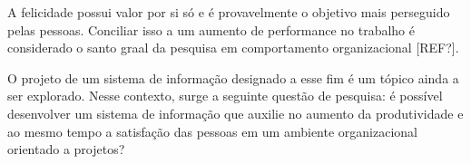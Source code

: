 A felicidade possui valor por si só e é provavelmente o objetivo mais perseguido pelas pessoas. Conciliar isso a um aumento de performance no trabalho é considerado o santo graal da pesquisa em comportamento organizacional [REF?]. 

O projeto de um sistema de informação designado a esse fim é um tópico ainda a ser explorado. Nesse contexto, surge a seguinte questão de pesquisa: é possível desenvolver um sistema de informação que auxilie no aumento da produtividade e ao mesmo tempo a satisfação das pessoas em um ambiente organizacional orientado a projetos?
